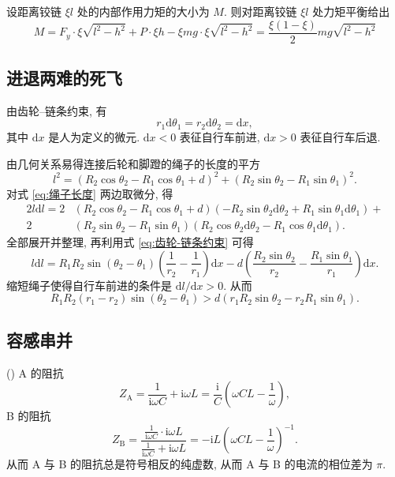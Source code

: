 \documentclass{article}
\newcounter{para}
\newcommand\mypara{\par\refstepcounter{para}(\thepara)\space}
\begin{document}
设距离铰链 $\xi l$ 处的内部作用力矩的大小为 $M$.
则对距离铰链 $\xi l$ 处力矩平衡给出
\begin{equation}
	M=F_y\cdot\xi\sqrt{l^2-h^2}+P\cdot\xi h-\xi mg\cdot\xi\sqrt{l^2-h^2}
	=\frac{\xi\left(1-\xi\right)}2mg\sqrt{l^2-h^2}
\end{equation}

\subsection{进退两难的死飞}
由齿轮--链条约束, 有
\begin{equation}
	r_1\mathrm d\theta_1=r_2\mathrm d\theta_2=\mathrm dx,
	\label{eq:齿轮-链条约束}
\end{equation}
其中 $\mathrm dx$ 是人为定义的微元.
$\mathrm dx<0$ 表征自行车前进, $\mathrm dx>0$ 表征自行车后退.

由几何关系易得连接后轮和脚蹬的绳子的长度的平方
\begin{equation}
	l^2=\left(R_2\cos\theta_2-R_1\cos\theta_1+d\right)^2+\left(R_2\sin\theta_2-R_1\sin\theta_1\right)^2.
	\label{eq:绳子长度}
\end{equation}
对式 \ref{eq:绳子长度} 两边取微分, 得
\begin{equation}
\begin{split}
	2l\mathrm dl
	=2&\left(R_2\cos\theta_2-R_1\cos\theta_1+d\right)\left(-R_2\sin\theta_2\mathrm d\theta_2+R_1\sin\theta_1\mathrm d\theta_1\right)+\\
	2&\left(R_2\sin\theta_2-R_1\sin\theta_1\right)\left(R_2\cos\theta_2\mathrm d\theta_2-R_1\cos\theta_1\mathrm d\theta_1\right).
\end{split}
\end{equation}
全部展开并整理, 再利用式 \ref{eq:齿轮-链条约束} 可得
\begin{equation}
	l\mathrm dl=R_1R_2\sin\left(\theta_2-\theta_1\right)\left(\frac1{r_2}-\frac1{r_1}\right)\mathrm dx-d\left(\frac{R_2\sin\theta_2}{r_2}-\frac{R_1\sin\theta_1}{r_1}\right)\mathrm dx.
\end{equation}
缩短绳子使得自行车前进的条件是 $\mathrm dl/\mathrm dx>0$.
从而
\begin{equation}
	R_1R_2\left(r_1-r_2\right)\sin\left(\theta_2-\theta_1\right)>d\left(r_1R_2\sin\theta_2-r_2R_1\sin\theta_1\right).
\end{equation}

\subsection{容感串并}
\mypara
A 的阻抗
\begin{equation}
	Z_\mathrm A=\frac1{\mathrm i\omega C}+\mathrm i\omega L=\frac{\mathrm i}C\left(\omega CL-\frac1\omega\right),
	\label{eq:A的阻抗}
\end{equation}
B 的阻抗
\begin{equation}
	Z_\mathrm B=\frac{\frac1{\mathrm i\omega C}\cdot\mathrm i\omega L}{\frac1{\mathrm i\omega C}+\mathrm i\omega L}=-\mathrm iL\left(\omega CL-\frac1\omega\right)^{-1}.
	\label{eq:B的阻抗}
\end{equation}
从而 A 与 B 的阻抗总是符号相反的纯虚数, 从而 A 与 B 的电流的相位差为 $\pi$.
\end{document}
